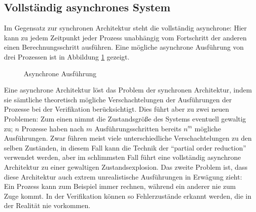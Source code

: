 \subsection{Vollständig asynchrones System}
Im Gegensatz zur synchronen Architektur steht die vollständig asynchrone: 
Hier kann zu jedem Zeitpunkt jeder Prozess unabhängig vom Fortschritt der anderen einen Berechnungsschritt ausführen.
Eine mögliche asynchrone Ausführung von drei Prozessen ist in Abbildung \ref{fig:asynchronous_execution} gezeigt.
\begin{figure}[h]
  \centering
  \caption{Asynchrone Ausführung}
  \label{fig:asynchronous_execution}
\end{figure}

Eine asynchrone Architektur löst das Problem der synchronen Architektur, indem sie sämtliche theoretisch mögliche Verschachtelungen der Ausführungen der Prozesse bei der Verifikation berücksichtigt.
Dies führt aber zu zwei neuen Problemen:
Zum einen nimmt die Zustandsgröße des Systems eventuell gewaltig zu; $n$ Prozesse haben nach $m$ Ausführungsschritten bereits $n^m$ mögliche Ausführungen.
Zwar führen meist viele unterschiedliche Verschachtelungen zu den selben Zuständen, in diesem Fall kann die Technik der "`partial order reduction"'~\cite{partial_order_reduction} verwendet werden, aber im schlimmsten Fall führt eine vollständig asynchrone Architektur zu einer gewaltigen Zustandsexplosion.
Das zweite Problem ist, dass diese Architektur auch extrem unrealistische Ausführungen in Erwägung zieht:
Ein Prozess kann zum Beispiel immer rechnen, während ein anderer nie zum Zuge kommt.
In der Verifikation können so Fehlerzustände erkannt werden, die in der Realität nie vorkommen.

